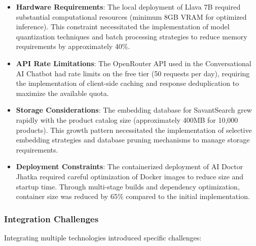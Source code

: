 \documentclass[12pt,a4paper]{article}
\begin{document}
\begin{itemize}
    \item \textbf{Hardware Requirements}: The local deployment of Llava 7B required substantial computational resources (minimum 8GB VRAM for optimized inference). This constraint necessitated the implementation of model quantization techniques and batch processing strategies to reduce memory requirements by approximately 40\%.
    
    \item \textbf{API Rate Limitations}: The OpenRouter API used in the Conversational AI Chatbot had rate limits on the free tier (50 requests per day), requiring the implementation of client-side caching and response deduplication to maximize the available quota.
    
    \item \textbf{Storage Considerations}: The embedding database for SavantSearch grew rapidly with the product catalog size (approximately 400MB for 10,000 products). This growth pattern necessitated the implementation of selective embedding strategies and database pruning mechanisms to manage storage requirements.
    
    \item \textbf{Deployment Constraints}: The containerized deployment of AI Doctor Jhatka required careful optimization of Docker images to reduce size and startup time. Through multi-stage builds and dependency optimization, container size was reduced by 65\% compared to the initial implementation.
\end{itemize}

\subsubsection{Integration Challenges}
Integrating multiple technologies introduced specific challenges:
\end{document}
